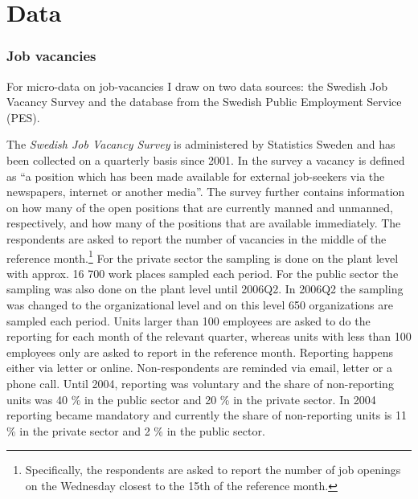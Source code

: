 \section{Data}
\label{sec:data}

\subsubsection{Job vacancies}

For micro-data on job-vacancies I draw on two data sources: the Swedish Job Vacancy Survey and the database from the Swedish Public Employment Service (PES). 

The \textit{Swedish Job Vacancy Survey} is administered by Statistics Sweden and has been collected on a quarterly basis since 2001. In the survey a vacancy is defined as 
\enquote{a position which has been made available for external job-seekers via the newspapers, internet or another media}. The survey further contains information on how many of the open positions that are currently manned and unmanned, respectively, and how many of the positions that are available immediately. The respondents are asked to report the number of vacancies in the middle of the reference month.\footnote{Specifically, the respondents are asked to report the number of job openings on the Wednesday closest to the 15th of the reference month.} For the private sector the sampling is done on the plant level with approx. 16 700 work places sampled each period. For the public sector the sampling was also done on the plant level until 2006Q2. In 2006Q2 the sampling was changed to the organizational level and on this level 650 organizations are sampled each period. Units larger than 100 employees are asked to do the reporting for each month of the relevant quarter, whereas units with less than 100 employees only are asked to report in the reference month. Reporting happens either via letter or online. Non-respondents are reminded via email, letter or a phone call. Until 2004, reporting was voluntary and the share of non-reporting units was 40 \% in the public sector and 20 \% in the private sector. In 2004 reporting became mandatory and currently the share of non-reporting units is 11 \% in the private sector and 2 \% in the public sector.

